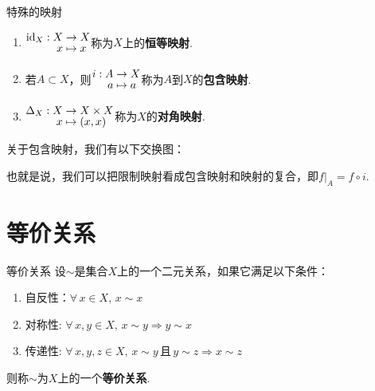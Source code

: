 \begin{definition}{特殊的映射}
    \begin{enumerate}
        \item ${\setjot[-2]\begin{aligned}
            \mathrm{id}_X: X &\to X \\
            x &\mapsto x
        \end{aligned}}$称为$X$上的\textbf{恒等映射}.
        \item 若$A\subset X$，则${\setjot[-2]\begin{aligned}
            i:A &\to X \\
            a &\mapsto a
        \end{aligned}}$称为$A$到$X$的\textbf{包含映射}.
        \item $\setjot[-2]\begin{aligned}
            \Delta_X:X &\to X\times X \\
            x &\mapsto (x,x)
        \end{aligned}$称为$X$的\textbf{对角映射}.
    \end{enumerate}
\end{definition}

\begin{remark}
    关于包含映射，我们有以下交换图： \par
    \begin{wrapfigure}{r}{0.25\textwidth}
        \vspace{-2 em}
        \vspace{-2 em}
    \end{wrapfigure}
    \par

也就是说，我们可以把限制映射看成包含映射和映射的复合，即$f|_A=f\circ i$.

\end{remark}

\section{等价关系}

\begin{definition}{等价关系}
    设$\sim$是集合$X$上的一个二元关系，如果它满足以下条件：
    \begin{enumerate}
        \item 自反性：$\forall\, x\in X,\,x\sim x$
        \item 对称性: $\forall\, x,y\in X,\,x\sim y\Rightarrow y\sim x$
        \item 传递性: $\forall\, x,y,z\in X,\,x\sim y\,\text{且}\,y\sim z\Rightarrow x\sim z$
    \end{enumerate}
    则称$\sim$为$X$上的一个\textbf{等价关系}.
\end{definition}



